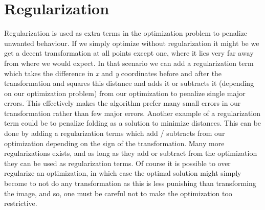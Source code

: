 \section{Regularization}
Regularization is used as extra terms in the optimization problem to penalize unwanted behaviour. If we simply optimize without regularization it might be we get a decent transformation at all points except one, where it lies very far away from where we would expect. In that scenario we can add a regularization term which takes the difference in \textit{x} and \textit{y} coordinates before and after the transformation and squares this distance and adds it or subtracts it (depending on our optimization problem) from our optimization to penalize single major errors. This effectively makes the algorithm prefer many small errors in our transformation rather than few major errors. Another example of a regularization term could be to penalize folding as a solution to minimize distances. This can be done by adding a regularization terms which add / subtracts from our optimization depending on the sign of the transformation. Many more regularizations exists, and as long as they add or subtract from the optimization they can be used as regularization terms. Of course it is possible to over regularize an optimization, in which case the optimal solution might simply become to not do any transformation as this is less punishing than transforming the image, and so, one must be careful not to make the optimization too restrictive.